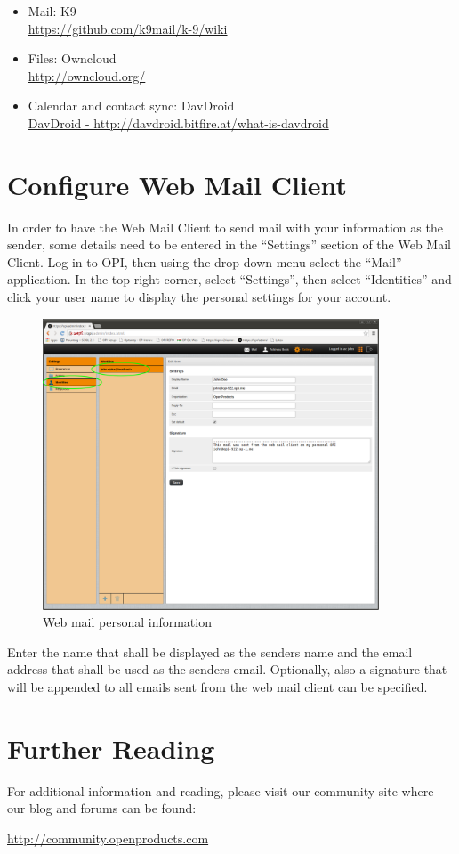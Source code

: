 \documentclass[12pt,a4paper,titlepage]{article}
\begin{document}
\begin{itemize}
\item Mail: K9\\ \href{https://github.com/k9mail/k-9/wiki}{https://github.com/k9mail/k-9/wiki}
\item Files: Owncloud\\ \href{http://owncloud.org/}{http://owncloud.org/}
\item Calendar and contact sync: DavDroid \\ \href{http://davdroid.bitfire.at/what-is-davdroid}{DavDroid - http://davdroid.bitfire.at/what-is-davdroid}
\end{itemize}

\newpage
\section{Configure Web Mail Client}
In order to have the Web Mail Client to send mail with your information as the sender, some details need to be entered in the ``Settings'' section of the Web Mail Client.
Log in to OPI, then using the drop down menu select the ``Mail'' application.
In the top right corner, select ``Settings'', then select ``Identities'' and click your user name to display the personal settings for your account.
\begin{figure}[h]
\centering
\includegraphics[width=10cm]{./img/webmail-config}
\caption{Web mail personal information}
\end{figure}
Enter the name that shall be displayed as the senders name and the email address that shall be used as the senders email.
Optionally, also a signature that will be appended to all emails sent from the web mail client can be specified.

\newpage
\section{Further Reading}
For additional information and reading, please visit our community site where our blog and forums can be found:

\href{http://community.openproducts.com}{http://community.openproducts.com}
\end{document}
